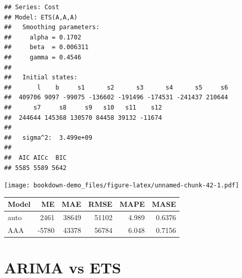 \documentclass[]{book}
\newenvironment{Shaded}{\begin{snugshade}}{\end{snugshade}}
\newcommand{\DataTypeTok}[1]{\textcolor[rgb]{0.13,0.29,0.53}{#1}}
\newcommand{\KeywordTok}[1]{\textcolor[rgb]{0.13,0.29,0.53}{\textbf{#1}}}
\newcommand{\NormalTok}[1]{#1}
\newcommand{\OperatorTok}[1]{\textcolor[rgb]{0.81,0.36,0.00}{\textbf{#1}}}
\newcommand{\StringTok}[1]{\textcolor[rgb]{0.31,0.60,0.02}{#1}}
\begin{document}
\begin{verbatim}
## Series: Cost 
## Model: ETS(A,A,A) 
##   Smoothing parameters:
##     alpha = 0.1702 
##     beta  = 0.006311 
##     gamma = 0.4546 
## 
##   Initial states:
##       l    b     s1      s2      s3      s4      s5     s6
##  409706 9097 -99075 -136602 -191496 -174531 -241437 210644
##      s7     s8     s9   s10   s11    s12
##  244644 145368 130570 84458 39132 -11674
## 
##   sigma^2:  3.499e+09
## 
##  AIC AICc  BIC 
## 5585 5589 5642
\end{verbatim}

\begin{Shaded}
\end{Shaded}

\texttt{[image: bookdown-demo\_files/figure-latex/unnamed-chunk-42-1.pdf]}

\begin{Shaded}
\end{Shaded}

\begin{tabular}{lrrrrr}
\toprule
Model & ME & MAE & RMSE & MAPE & MASE\\
\midrule
auto & 2461 & 38649 & 51102 & 4.989 & 0.6376\\
AAA & -5780 & 43378 & 56784 & 6.048 & 0.7156\\
\bottomrule
\end{tabular}

\hypertarget{arima-vs-ets}{%
\section{ARIMA vs ETS}\label{arima-vs-ets}}
\end{document}
